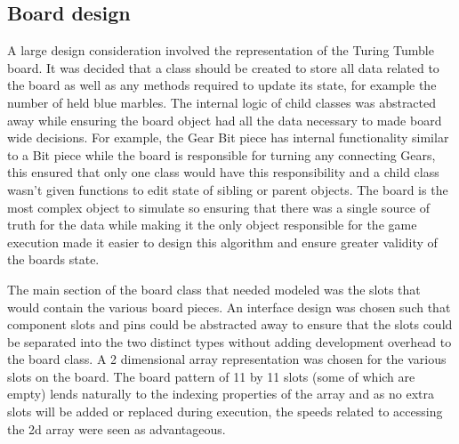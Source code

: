 \documentclass{l4proj}
\begin{document}
\subsection{Board design}
A large design consideration involved the representation of the Turing Tumble board. It was decided that a class should be created to store all data related to the board as well as any methods required to update its state, for example the number of held blue marbles. The internal logic of child classes was abstracted away while ensuring the board object had all the data necessary to made board wide decisions. For example, the Gear Bit piece has internal functionality similar to a Bit piece while the board is responsible for turning any connecting Gears, this ensured that only one class would have this responsibility and a child class wasn't given functions to edit state of sibling or parent objects. The board is the most complex object to simulate so ensuring that there was a single source of truth for the data while making it the only object responsible for the game execution made it easier to design this algorithm and ensure greater validity of the boards state. 

The main section of the board class that needed modeled was the slots that would contain the various board pieces. An interface design was chosen such that component slots and pins could be abstracted away to ensure that the slots could be separated into the two distinct types without adding development overhead to the board class. A 2 dimensional array representation was chosen for the various slots on the board. The board pattern of 11 by 11 slots (some of which are empty) lends naturally to the indexing properties of the array and as no extra slots will be added or replaced during execution, the speeds related to accessing the 2d array were seen as advantageous. 


\end{document}
